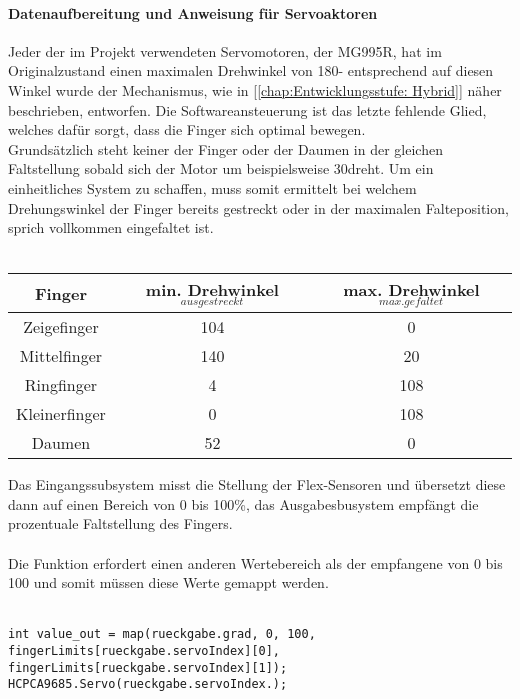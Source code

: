 \documentclass[titlepage,12pt,twoside]{article}
\begin{document}
\paragraph{Datenaufbereitung und Anweisung für Servoaktoren}
\label{par:Datenaufbereitung und Anweisung für Servoaktoren}
\hfill \break
\hfill \break
Jeder der im Projekt verwendeten Servomotoren, der MG995R, hat im Originalzustand einen maximalen Drehwinkel von 180\textdegree - entsprechend auf diesen 
Winkel wurde der Mechanismus, wie in [\textcolor{blue}{\autoref{chap:Entwicklungsstufe: Hybrid}}] näher beschrieben, entworfen. Die Softwareansteuerung ist das letzte 
fehlende Glied, welches dafür sorgt, dass die Finger sich optimal bewegen. \\
Grundsätzlich steht keiner der Finger oder der Daumen in der gleichen Faltstellung sobald sich der Motor um beispielsweise 30\textdegree dreht. Um ein einheitliches 
System zu schaffen, muss somit ermittelt bei welchem Drehungswinkel der Finger bereits gestreckt oder in der maximalen Falteposition, sprich vollkommen 
eingefaltet ist. \\
\\
\begin{table}[H]
    \centering
    \begin{tabular}{|c|c|c|}  %
        \hline
        \textbf{Finger} & \textbf{min. Drehwinkel$_{ausgestreckt}$} & \textbf{max. Drehwinkel$_{max. gefaltet}$} \\
        \hline
		Zeigefinger & 104\textdegree & 0\textdegree \\
		\hline
		Mittelfinger & 140\textdegree & 20\textdegree \\
		\hline
		Ringfinger & 4\textdegree & 108\textdegree \\
		\hline
		Kleinerfinger & 0\textdegree & 108\textdegree \\
		\hline
		Daumen & 52\textdegree & 0\textdegree \\
		\hline
    \end{tabular}
    \label{tab:Servo Drehwinkel}
\end{table}
\hfill \break
Das Eingangssubsystem misst die Stellung der Flex-Sensoren und übersetzt diese dann auf einen Bereich von 0 bis 100\%, das Ausgabesbusystem empfängt 
die prozentuale Faltstellung des Fingers. \\
\\
Die Funktion  erfordert einen anderen Wertebereich als der empfangene von 0 bis 100 und somit müssen diese Werte gemappt werden. \\
\\
\footnotesize
\begin{lstlisting}
int value_out = map(rueckgabe.grad, 0, 100, fingerLimits[rueckgabe.servoIndex][0], 
fingerLimits[rueckgabe.servoIndex][1]);
HCPCA9685.Servo(rueckgabe.servoIndex.);
\end{lstlisting}
\hfill \break
\normalsize
\end{document}
